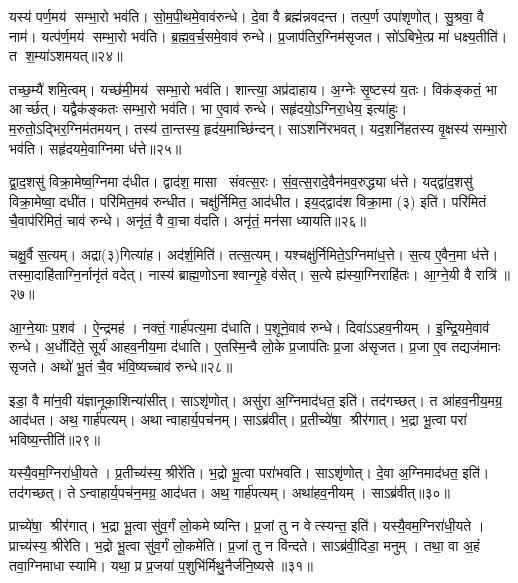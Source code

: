यस्य॑ पर्ण॒मय॑ सम्भा॒रो भव॑ति।
सो॒म॒पी॒थमे॒वाव॑रुन्धे।
दे॒वा वै ब्रह्म॑न्नवदन्त।
तत्प॒र्ण उपा॑शृणोत्।
सु॒श्रवा॒ वै नाम॑।
यत्प॑र्ण॒मय॑ सम्भा॒रो भव॑ति।
ब्र॒ह्म॒व॒र्च॒समे॒वाव॑ रुन्धे।
प्र॒जाप॑तिर॒ग्निम॑सृजत।
सो॑ऽबिभे॒त्प्र मा॑ धक्ष्य॒तीति॑।
त श॒म्या॑ऽशमयत्॥२४॥

तच्छ॒म्यै॑ शमि॒त्वम्।
यच्छ॑मी॒मय॑ सम्भा॒रो भव॑ति।
शान्त्या॒ अप्र॑दाहाय।
अ॒ग्नेः सृ॒ष्टस्य॑ य॒तः।
विक॑ङ्कतं॒ भा आर्च्छत्।
यद्वैक॑ङ्कतः सम्भा॒रो भव॑ति।
भा ए॒वाव॑ रुन्धे।
सहृ॑दयो॒ऽग्निरा॒धेय॒ इत्या॑हुः।
म॒रुतो॒ऽद्भिर॒ग्निम॑तमयन्।
तस्य॑ ता॒न्तस्य॒ हृद॑य॒माच्छि॑न्दन्।
साऽशनि॑रभवत्।
यद॒शनि॑हतस्य वृ॒क्षस्य॑ सम्भा॒रो भव॑ति।
सहृ॑दयमे॒वाग्निमा ध॑त्ते॥२५॥

द्वा॒द॒शसु॑ विक्रा॒मेष्व॒ग्निमा द॑धीत।
द्वाद॑श॒ मासा संवत्स॒रः।
सं॒व॒त्स॒रादे॒वैन॑मव॒रुद्ध्या ध॑त्ते।
यद्द्वा॑द॒शसु॑ विक्रा॒मेष्वा॒ दधी॑त।
परि॑मित॒मव॑ रुन्धीत।
चक्षु॑र्निमित॒ आद॑धीत।
इय॒द्द्वाद॑श विक्रा॒मा (३) इति॑।
परि॑मितं चै॒वाप॑रिमितं॒ चाव॑ रुन्धे।
अनृ॑तं॒ वै वा॒चा व॑दति।
अनृ॑तं॒ मन॑सा ध्यायति॥२६॥

चक्षु॒र्वै स॒त्यम्।
अद्रा(३)गित्या॑ह।
अद॑र्\mbox{}श॒मिति॑।
तत्स॒त्यम्।
यश्चक्षु॑र्निमिते॒ऽग्निमा॑ध॒त्ते।
स॒त्य ए॒वैन॒मा ध॑त्ते।
तस्मा॒दाहि॑ताग्नि॒र्नानृ॑तं वदेत्।
नास्य॑ ब्राह्म॒णोऽनाश्वान्गृ॒हे व॑सेत्।
स॒त्ये ह्य॑स्या॒ग्निराहि॑तः।
आ॒ग्ने॒यी वै रात्रि॑॥२७॥

आ॒ग्ने॒याः प॒शव॑।
ऐ॒न्द्रमह॑।
नक्तं॒ गार्\mbox{}ह॑पत्य॒मा द॑धाति।
प॒शूने॒वाव॑ रुन्धे।
दिवा॑ऽऽहव॒नीयम्।
इ॒न्द्रि॒यमे॒वाव॑ रुन्धे।
अ॒र्धोदि॑ते॒ सूर्य॑ आहव॒नीय॒मा द॑धाति।
ए॒तस्मि॒न्वै लो॒के प्र॒जाप॑तिः प्र॒जा अ॑सृजत।
प्र॒जा ए॒व तद्यज॑मानः सृजते।
अथो॑ भू॒तं चै॒व भ॑वि॒ष्यच्चाव॑ रुन्धे॥२८॥

इडा॒ वै मा॑न॒वी य॑ज्ञानूका॒शिन्या॑सीत्।
साऽशृ॑णोत्।
असु॑रा अ॒ग्निमाद॑धत॒ इति॑।
तद॑गच्छत्।
त आ॑हव॒नीय॒मग्र॒ आद॑धत।
अथ॒ गार्\mbox{}ह॑पत्यम्।
अथान्वाहार्य॒पच॑नम्।
साऽब्र॑वीत्।
प्र॒तीच्ये॑षा॒ श्रीर॑गात्।
भ॒द्रा भू॒त्वा परा॑ भविष्य॒न्तीति॑॥२९॥

यस्यै॒वम॒ग्निरा॑धी॒यते।
प्र॒तीच्य॑स्य॒ श्रीरे॑ति।
भ॒द्रो भू॒त्वा परा॑भवति।
साऽशृ॑णोत्।
दे॒वा अ॒ग्निमाद॑धत॒ इति॑।
तद॑गच्छत्।
तेऽन्वाहार्य॒पच॑न॒मग्र॒ आद॑धत।
अथ॒ गार्\mbox{}ह॑पत्यम्।
अथा॑हव॒नीयम्।
साऽब्र॑वीत्॥३०॥

प्राच्ये॑षा॒ श्रीर॑गात्।
भ॒द्रा भू॒त्वा सु॑व॒र्गं लो॒कमेष्यन्ति।
प्र॒जां तु न वेत्स्यन्त॒ इति॑।
यस्यै॒वम॒ग्निरा॑धी॒यते।
प्राच्य॑स्य॒ श्रीरे॑ति।
भ॒द्रो भू॒त्वा सु॑व॒र्गं लो॒कमे॑ति।
प्र॒जां तु न वि॑न्दते।
साऽब्र॑वी॒दिडा॒ मनुम्।
तथा॒ वा अ॒हं तवा॒ग्निमाधास्यामि।
यथा॒ प्र प्र॒जया॑ प॒शुभि॑र्मिथु॒नैर्ज॑नि॒ष्यसे॥३१॥

